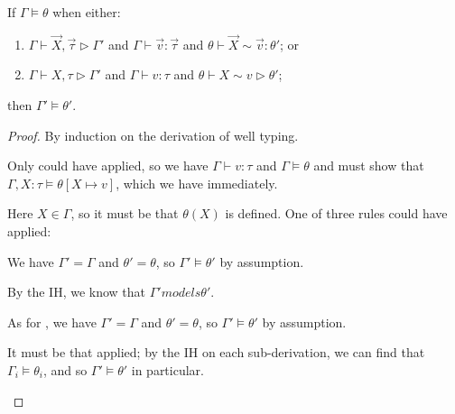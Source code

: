 \documentclass[acmsmall,screen,nonacm]{acmart}
\theoremstyle{definition}
\begin{document}
\begin{lemma}
\label{lem:typesafe-value-unification}
  If $\Gamma \models \theta$ when either:
%
  \begin{enumerate}

  \item $\Gamma \vdash \vec{X}, \vec{\tau} \rhd \Gamma'$ and
  $\Gamma \vdash \vec{v} : \vec{\tau}$ and
  $\theta \vdash \vec{X} \sim \vec{v} : \theta'$; or

  \item $\Gamma \vdash X, \tau \rhd \Gamma'$ and $\Gamma \vdash v
  : \tau$ and $\theta \vdash X \sim v \rhd \theta'$;

  \end{enumerate}
%
  then $\Gamma' \models \theta'$.

\begin{proof}
  By induction on the derivation of well typing.
%
\begin{proofcases}

  \item[(\rn{$X\tau$-Bind})] Only  could have
  applied, so we have $\Gamma \vdash v : \tau$ and
  $\Gamma \models \theta$ and must show that
  $\Gamma,X:\tau \models \theta[X \mapsto v]$, which we have
  immediately.
  
  \item[(\rn{$X\tau$-Check})] Here $X \in \Gamma$, so it must be that
  $\theta(X)$ is defined. One of three rules could have applied:

  \begin{proofcases}

    \item[(\rn{$uv$-Eq-Var})] We have $\Gamma' = \Gamma$ and $\theta'
    = \theta$, so $\Gamma' \models \theta'$ by assumption.

    \item[(\rn{$uv$-Ctor})] By the IH, we know that $\Gamma' models \theta'$.

    \item[(\rn{$uv$-Constant})] As for , we have
    $\Gamma' = \Gamma$ and $\theta' = \theta$, so
    $\Gamma' \models \theta'$ by assumption.

  \end{proofcases}

  \item[(\rn{$X\tau$-All})] It must be that 
  applied; by the IH on each sub-derivation, we can find that
  $\Gamma_i \models \theta_i$, and so $\Gamma' \models \theta'$ in
  particular.

\end{proofcases}
\end{proof}
\end{lemma}
\end{document}
